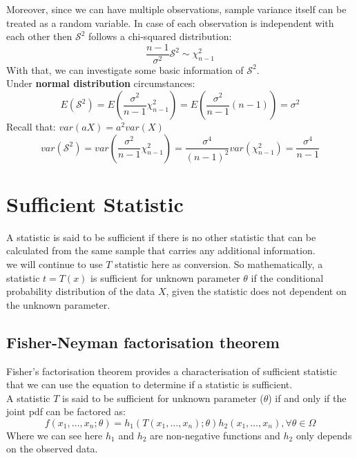 \documentclass[12pt ]{article}
\begin{document}
Moreover, since we can have multiple observations, sample variance itself can be treated as a random variable. In case of each observation is independent with each other then $\mathcal{S}^2$ follows a chi-squared distribution:
\begin{equation}
\frac{n-1}{\sigma^2} \mathcal{S}^2 \sim \chi_{n-1}^{2}
\end{equation}
With that, we can investigate some basic information of $\mathcal{S}^2 $.\\
Under \textbf{normal distribution} circumstances:
\begin{equation}
E(\mathcal{S}^2) = E(\frac{\sigma^2}{n-1} \chi_{n-1}^{2}) = E(\frac{\sigma^2}{n-1} (n-1)) = \sigma^2
\end{equation}
Recall that: $var(aX) = a^2 var(X)$
\begin{equation}
var(\mathcal{S}^2) = var(\frac{\sigma^2}{n-1} \chi_{n-1}^{2}) = \frac{\sigma^4}{(n-1)^2} var(\chi_{n-1}^{2}) = \frac{\sigma^4}{n-1}
\end{equation} 

\section{Sufficient Statistic}
A statistic is said to be sufficient if there is no other statistic that can be calculated from the same sample that carries any additional information.\\

we will continue to use $T$ statistic here as conversion. So mathematically, a statistic $t = T(x)$ is sufficient for unknown parameter $\theta$ if the conditional probability distribution of the data $X$, given the statistic does not dependent on the unknown parameter.

\subsection{Fisher-Neyman factorisation theorem}
Fisher's factorisation theorem provides a characterisation of sufficient statistic that we can use the equation to determine if a statistic is sufficient.\\
A statistic $T$ is said to be sufficient for unknown parameter ($\theta$) if and only if the joint pdf can be factored as:
\begin{equation}
f(x_{1}, \ldots, x_{n}; \theta) = h_{1}(T(x_{1}, \ldots, x_{n}); \theta)h_{2}(x_{1}, \ldots, x_{n}), \forall \theta \in \Omega
\end{equation}
Where we can see here $h_{1}$ and $h_{2}$ are non-negative functions and $h_{2}$ only depends on the observed data.
\end{document}
